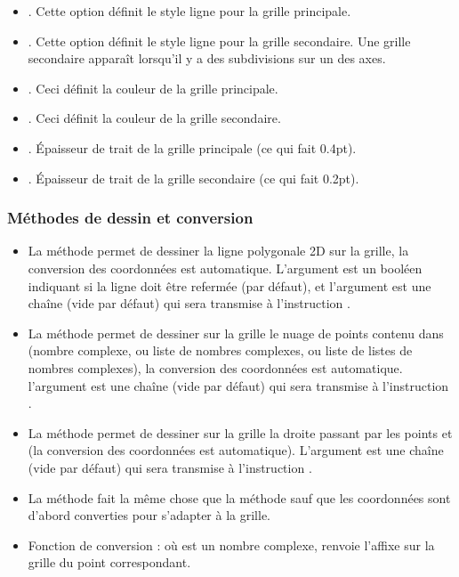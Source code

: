 \begin{itemize}
\begin{itemize}
        \item {}. Cette option définit le style ligne pour la grille principale.
        
        \item {}. Cette option définit le style ligne pour la grille secondaire. Une grille secondaire apparaît lorsqu'il y a des subdivisions sur un des axes.
        \item  {}. Ceci définit la couleur de la grille principale.
        \item {}. Ceci définit la couleur de la grille secondaire.
        \item {}. Épaisseur de trait de la grille principale (ce qui fait 0.4pt).
        \item {}. Épaisseur de trait de la grille secondaire (ce qui fait 0.2pt).
    \end{itemize}
\end{itemize}

\subsubsection{Méthodes de dessin et conversion}

\begin{itemize}
    \item La méthode  permet de dessiner la ligne polygonale 2D  sur la grille, la conversion des coordonnées est automatique. L'argument  est un booléen indiquant si la ligne doit être refermée (\false par défaut), et l'argument  est une chaîne (vide par défaut) qui sera transmise à l'instruction \drawcmd.
    
    \item La méthode  permet de dessiner sur la grille le nuage de points contenu dans  (nombre complexe, ou liste de nombres complexes, ou liste de listes de nombres complexes), la conversion des coordonnées est automatique. l'argument  est une chaîne (vide par défaut) qui sera transmise à l'instruction \drawcmd.
    
    \item La méthode  permet de dessiner sur la grille la droite passant par les points  et  (la conversion des coordonnées est automatique). L'argument  est une chaîne (vide par défaut) qui sera transmise à l'instruction \drawcmd.
    
    \item La méthode  fait la même chose que la méthode  sauf que les coordonnées sont d'abord converties pour s'adapter à la grille.
    
    \item Fonction de conversion :  où  est un nombre complexe, renvoie l'affixe sur la grille du point correspondant.
\end{itemize}

